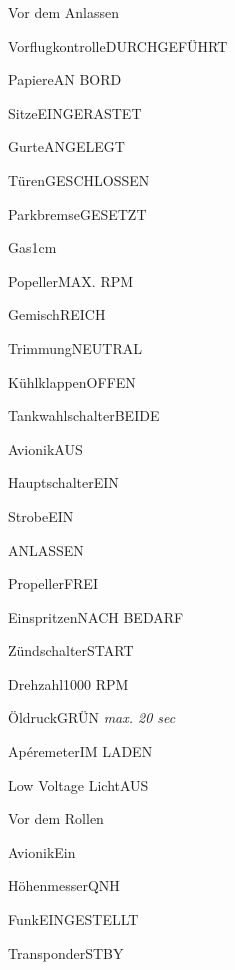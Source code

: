 



\begin{task}
  \begin{checklist}{Vor dem Anlassen}
    \item{Vorflugkontrolle}{DURCHGEFÜHRT}
    \item{Papiere}{AN BORD}
    \item{Sitze}{EINGERASTET}
    \item{Gurte}{ANGELEGT}
    \item{Türen}{GESCHLOSSEN}
    \item{Parkbremse}{GESETZT}
    \item{Gas}{1cm}
    \item{Popeller}{MAX. RPM}
    \item{Gemisch}{REICH}
    \item{Trimmung}{NEUTRAL}
    \item{Kühlklappen}{OFFEN}
    \item{Tankwahlschalter}{BEIDE}
    \item{Avionik}{AUS}
    \item{Hauptschalter}{EIN}
    \item{Strobe}{EIN}
  \end{checklist}
\end{task}

\begin{task}
  \begin{checklist}{ANLASSEN}
    \item{Propeller}{FREI}
    \item{Einspritzen}{NACH BEDARF}
    \item{Zündschalter}{START}
    \item{Drehzahl}{1000 RPM}
    \item{Öldruck}{GRÜN \textit{max. 20 sec}}
    \item{Apéremeter}{IM LADEN}
    \item{Low Voltage Licht}{AUS}
  \end{checklist}
\end{task}

\begin{task}
  \begin{checklist}{Vor dem Rollen}
    \item{Avionik}{Ein}
    \item{Höhenmesser}{QNH}
    \item{Funk}{EINGESTELLT}
    \item{Transponder}{STBY}
  \end{checklist}
\end{task}

